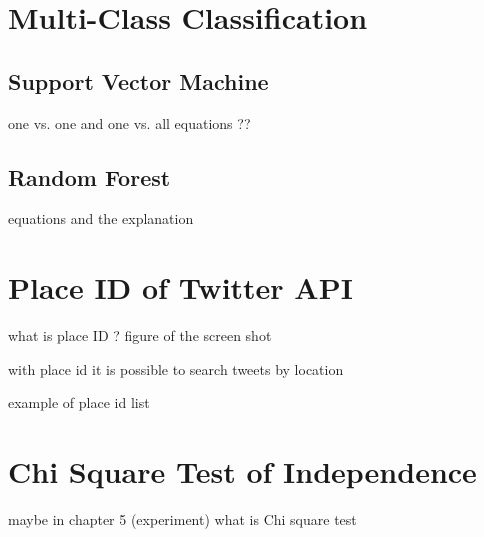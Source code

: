 \section{Multi-Class Classification} 
\subsection{Support Vector Machine}
one vs. one and one vs. all
equations ??
\subsection{Random Forest}
equations and the explanation

\section{Place ID of Twitter API}
what is place ID ?
figure of the screen shot 

with place id it is possible to search tweets by location

example of place id list

\section{Chi Square Test of Independence}
maybe in chapter 5 (experiment)
what is Chi square test
